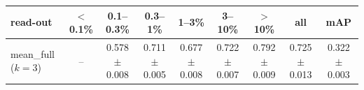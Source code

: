 \begin{tabular}{lcccccccc}
\toprule
read-out & $<$0.1\% & 0.1--0.3\% & 0.3--1\% & 1--3\% & 3--10\% & $>$10\% & all & mAP \\
\midrule
mean\_full ($k=3$) & -- & 0.578 $\pm$ 0.008 & 0.711 $\pm$ 0.005 & 0.677 $\pm$ 0.008 & 0.722 $\pm$ 0.007 & 0.792 $\pm$ 0.009 & 0.725 $\pm$ 0.013 & 0.322 $\pm$ 0.003 \\
\bottomrule
\end{tabular}
